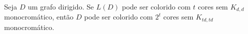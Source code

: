 





\begin{lema}\label{shiftlema1}
Seja $D$ um grafo dirigido. Se $L(D)$ pode ser colorido com $t$ cores sem $K_{d,d}$ monocromático, então $D$ pode ser colorido com $2^t$ cores sem $K_{td,td}$ monocromático.
\end{lema}

